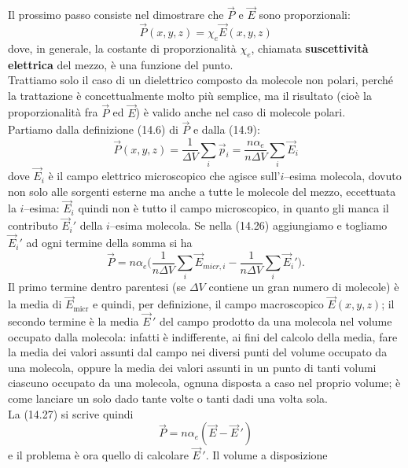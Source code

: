 Il prossimo passo consiste nel dimostrare che $\vec P$ e $\vec E$ sono
proporzionali:
\begin{equation}
  \vec P(x,y,z)=\chi_e\vec E(x,y,z)
  \tag{14.25}
\end{equation}
dove, in generale, la costante di proporzionalit\`a $\chi_e$, chiamata
\textbf{suscettivit\`a elettrica} del mezzo, \`e una funzione del punto.\\
Trattiamo solo il caso di un dielettrico composto da molecole non polari,
perch\'e la trattazione \`e concettualmente molto pi\`u semplice, ma il
risultato (cio\`e la proporzionalit\`a fra $\vec P$ ed $\vec E$) \`e valido
anche nel caso di molecole polari.\\
Partiamo dalla definizione (14.6) di $\vec P$ e dalla (14.9):
\begin{equation}
  \vec P(x,y,z)=\frac{1}{\Delta V}\textstyle\sum_i\vec p_i
  =\dfrac{n\alpha_e}{n\Delta V}\sum_i\vec E_i
  \tag{14.26}
\end{equation}
dove $\vec E_i$ \`e il campo elettrico microscopico che agisce sull'$i$--esima
molecola, dovuto non solo alle sorgenti esterne ma anche a tutte le molecole del
mezzo, eccettuata la $i$--esima:
$\vec E_i$ quindi non \`e tutto il campo microscopico, in quanto gli manca il
contributo $\vec E_i'$ della $i$--esima molecola. Se nella (14.26) aggiungiamo e
togliamo $\vec E_i'$ ad ogni termine della somma si ha
\begin{equation}
  \vec P=n\alpha_e\Big(\frac{1}{n\Delta V}\textstyle\sum_i\vec E_{micr,i}
  -\dfrac{1}{n\Delta V}\sum_i\vec E_i'\Big).
  \tag{14.27}
\end{equation}
Il primo termine dentro parentesi (se $\Delta V$ contiene un gran numero di
molecole) \`e la media di $\vec E_\mathrm{micr}$ e quindi, per definizione, il
campo macroscopico $\vec E(x,y,z)$; il secondo termine \`e la media $\vec E\,'$
del campo prodotto da una molecola nel volume occupato dalla molecola: infatti
\`e indifferente, ai fini del calcolo della media, fare la media dei valori
assunti dal campo nei diversi punti del volume occupato da una molecola, oppure
la media dei valori assunti in un punto di tanti volumi ciascuno occupato da una
molecola, ognuna disposta a caso nel proprio volume; \`e come lanciare un solo
dado tante volte o tanti dadi una volta sola.\\
La (14.27) si scrive quindi
\begin{equation}
  \vec P=n\alpha_e(\vec E-\vec E\,')
  \tag{14.28}
\end{equation}
e il problema \`e ora quello di calcolare $\vec E\,'$. Il volume a disposizione
